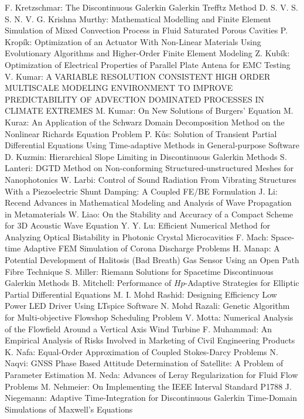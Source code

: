 \documentclass[10pt, A4]{article}%
\begin{document}
{F. Kretzschmar}: {The Discontinuous Galerkin Galerkin Trefftz Method}
{D. S. V. S. S. N. V. G. Krishna Murthy}: {Mathematical Modelling and Finite Element Simulation of Mixed Convection Process in Fluid Saturated Porous Cavities}
{P. Kropík}: {Optimization of an Actuator With Non-Linear Materials Using Evolutionary Algorithms and Higher-Order Finite Element Modeling}
{Z. Kubík}: {Optimization of Electrical Properties of Parallel Plate Antena for EMC Testing}
{V. Kumar}: {A VARIABLE RESOLUTION CONSISTENT HIGH ORDER MULTISCALE MODELING ENVIRONMENT TO IMPROVE PREDICTABILITY OF ADVECTION DOMINATED PROCESSES IN CLIMATE EXTREMES}
{M. Kumar}: {On New Solutions of Burgers' Equation}
{M. Kuraz}: {An Application of the Schwarz Domain Decomposition Method on the Nonlinear Richards Equation Problem}
{P. Kůs}: {Solution of Transient Partial Differential Equations Using Time-adaptive Methods in General-purpose Software}
{D. Kuzmin}: {Hierarchical Slope Limiting in  Discontinuous Galerkin Methods}
{S. Lanteri}: {DGTD  Method  on  Non-conforming  Structured-unstructured  Meshes  for Nanophotonics}
{W. Larbi}: {Control of Sound Radiation From Vibrating Structures With a Piezoelectric Shunt Damping: A Coupled FE/BE Formulation}
{J. Li}: {Recend Advances in Mathematical Modeling and Analysis of Wave Propagation in Metamaterials}
{W. Liao}: {On the Stability and Accuracy of a Compact Scheme for 3D Acoustic Wave Equation}
{Y. Y. Lu}: {Efficient Numerical Method for Analyzing Optical Bistability in Photonic Crystal Microcavities}
{F. Mach}: {Space-time Adaptive FEM Simulation of Corona Discharge Problems}
{H. Manap}: {A Potential Development of Halitosis (Bad Breath) Gas Sensor Using an Open Path Fibre Technique}
{S. Miller}: {Riemann Solutions for Spacetime Discontinuous Galerkin Methods}
{B. Mitchell}: {Performance of $Hp$-Adaptive Strategies for Elliptic Partial Differential Equations}
{M. I. Mohd Rashid}: {Designing Efficiency Low Power LED Driver Using LTspice Software}
{N. Mohd Razali}: {Genetic Algorithm for Multi-objective Flowshop Scheduling Problem}
{V. Motta}: {Numerical Analysis of the Flowfield Around a Vertical Axis Wind Turbine}
{F. Muhammad}: {An Empirical Analysis of Risks Involved in Marketing of Civil Engineering Products}
{K. Nafa}: {Equal-Order Approximation of Coupled Stokes-Darcy Problems}
{N. Naqvi}: {GNSS Phase Based Attitude Determination of Satellite: A Problem of Parameter Estimation}
{M. Neda}: {Advances of Leray Regularization for Fluid Flow Problems}
{M. Nehmeier}: {On Implementing  the IEEE Interval Standard P1788}
{J. Niegemann}: {Adaptive Time-Integration for Discontinuous Galerkin Time-Domain Simulations of Maxwell's Equations}
\end{document}
